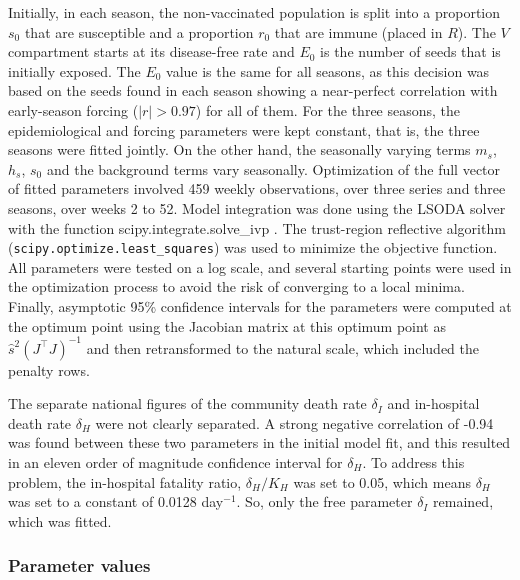 \documentclass[12pt,a4paper]{article}
\theoremstyle{definition}
\theoremstyle{remark}
\begin{document}
Initially, in each season, the non-vaccinated population is split into a proportion $s_0$ that are susceptible and a proportion $r_0$ that are immune (placed in $R$). The $V$ compartment starts at its disease-free rate and $E_0$ is the number of seeds that is initially exposed. The $E_0$ value is the same for all seasons, as this decision was based on the seeds found in each season showing a near-perfect correlation with early-season forcing ($\vert{}r\vert{} > 0.97$) for all of them. For the three seasons, the epidemiological and forcing parameters were kept constant, that is, the three seasons were fitted jointly. On the other hand, the seasonally varying terms $m_s$, $h_s$, $s_0$ and the background terms vary seasonally. Optimization of the full vector of fitted parameters involved 459 weekly observations, over three series and three seasons, over weeks 2 to 52. Model integration was done using the LSODA solver with the function scipy.integrate.solve\_ivp \cite{virtanen2020scipy}. The trust-region reflective algorithm \cite{branch1999subspace} (\texttt{scipy.optimize.least\_squares}) was used to minimize the objective function. All parameters were tested on a log scale, and several starting points were used in the optimization process to avoid the risk of converging to a local minima. Finally, asymptotic 95\% confidence intervals for the parameters were computed at the optimum point using the Jacobian matrix at this optimum point as $\hat{s}^2(J^{\top}J)^{-1}$ and then retransformed to the natural scale, which included the penalty rows.




The separate national figures of the community death rate $\delta_I$ and in-hospital death rate $\delta_H$ were not clearly separated. A strong negative correlation of -0.94 was found between these two parameters in the initial model fit, and this resulted in an eleven order of magnitude confidence interval for $\delta_H$. To address this problem, the in-hospital fatality ratio, $\delta_H/K_H$ was set to 0.05, which means $\delta_H$ was set to a constant of 0.0128 day$^{-1}$. So, only the free parameter $\delta_I$ remained, which was fitted.



\subsubsection{Parameter values}
\end{document}
